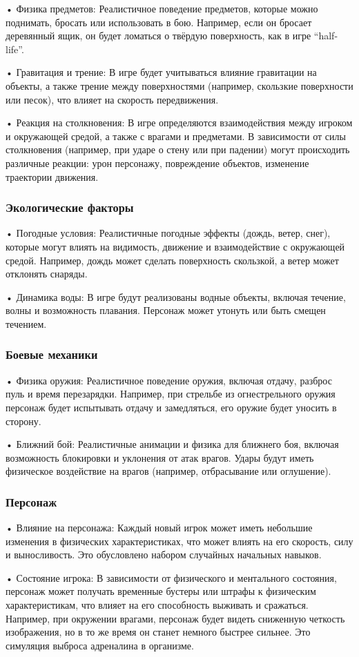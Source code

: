 \documentclass[a4paper,12pt]{article}
\begin{document}
•	Физика предметов: Реалистичное поведение предметов, которые можно поднимать, бросать или использовать в бою. Например, если он бросает деревянный ящик, он будет ломаться о твёрдую поверхность, как в игре “half-life”.

•	Гравитация и трение: В игре будет учитываться влияние гравитации на объекты, а также трение между поверхностями (например, скользкие поверхности или песок), что влияет на скорость передвижения.

•	Реакция на столкновения: В игре определяются взаимодействия между игроком и окружающей средой, а также с врагами и предметами. В зависимости от силы столкновения (например, при ударе о стену или при падении) могут происходить различные реакции: урон персонажу, повреждение объектов, изменение траектории движения.
\subsubsection{Экологические факторы}
•	Погодные условия: Реалистичные погодные эффекты (дождь, ветер, снег), которые могут влиять на видимость, движение и взаимодействие с окружающей средой. Например, дождь может сделать поверхность скользкой, а ветер может отклонять снаряды.

•	Динамика воды: В игре будут реализованы водные объекты, включая течение, волны и возможность плавания. Персонаж может утонуть или быть смещен течением.
\subsubsection{Боевые механики}
•	Физика оружия: Реалистичное поведение оружия, включая отдачу, разброс пуль и время перезарядки. Например, при стрельбе из огнестрельного оружия персонаж будет испытывать отдачу и замедляться, его оружие будет уносить в сторону.

•	Ближний бой: Реалистичные анимации и физика для ближнего боя, включая возможность блокировки и уклонения от атак врагов. Удары будут иметь физическое воздействие на врагов (например, отбрасывание или оглушение).
\subsubsection{Персонаж}
•	Влияние на персонажа: Каждый новый игрок может иметь небольшие изменения в физических характеристиках, что может влиять на его скорость, силу и выносливость. Это обусловлено набором случайных начальных навыков.

•	Состояние игрока: В зависимости от физического и ментального состояния, персонаж может получать временные бустеры или штрафы к физическим характеристикам, что влияет на его способность выживать и сражаться. Например, при окружении врагами, персонаж будет видеть сниженную четкость изображения, но в то же время он станет немного быстрее сильнее. Это симуляция выброса адреналина в организме.
\end{document}

